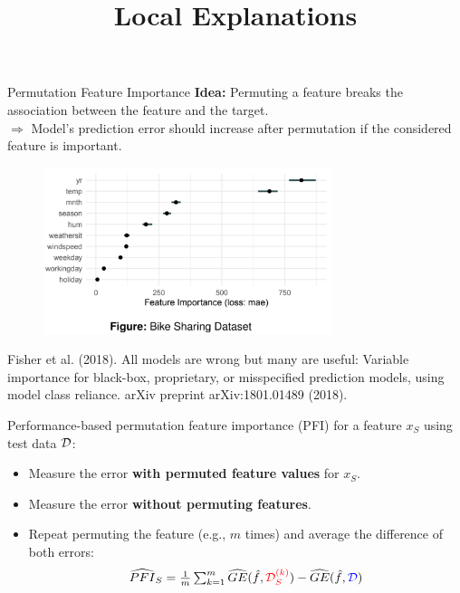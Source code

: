 \documentclass[11pt,compress,t,notes=noshow, xcolor=table]{beamer}
\title{Local Explanations}
\institute{\href{https://compstat-lmu.github.io/lecture_i2ml/}{compstat-lmu.github.io/lecture\_i2ml}}
\date{}
\begin{document}
	
	
	
	
	
	
	
	
	


\begin{vbframe}{Permutation Feature Importance}
\textbf{Idea:} Permuting a feature breaks the association between the feature and the target.\\
$\Rightarrow$ Model's prediction error should increase after permutation if the considered feature is important.

\begin{figure}
  \includegraphics[width=0.75\textwidth]{figure_man/feature-importance.png}
\end{figure}

\vspace{-0.2cm}
\tiny{Fisher et al. (2018). All models are wrong but many are useful: Variable importance for black-box, proprietary, or misspecified prediction models, using model class reliance. arXiv preprint arXiv:1801.01489 (2018).}

\framebreak
\normalsize

Performance-based permutation feature importance (PFI) for a feature $x_S$ using test data $\D$:
\begin{itemize}
  \item Measure the error \color{red}\textbf{with permuted feature values} \color{black} for $x_S$.
  \item Measure the error \color{blue}\textbf{without permuting features}\color{black}.
  \item Repeat permuting the feature (e.g., $m$ times) and average the difference of both errors: 
$$\widehat{PFI}_S = \tfrac{1}{m} \textstyle\sum\nolimits_{k = 1}^{m} \widehat{GE}(\fh, {\color{red}\D_{S}^{(k)}}) - \widehat{GE}(\fh, {\color{blue}\D})$$
\end{itemize}


\end{vbframe}
\end{document}
